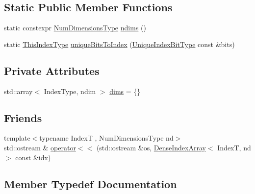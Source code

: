 \subsection*{Static Public Member Functions}
\begin{DoxyCompactItemize}
\item 
static constexpr \hyperlink{namespacevt_1_1index_a97aa9370711425850c86bcb7a20d73e8}{Num\+Dimensions\+Type} \hyperlink{structvt_1_1index_1_1_dense_index_array_a7a9a9e350279381589bfe1c75526c12a}{ndims} ()
\item 
static \hyperlink{structvt_1_1index_1_1_dense_index_array_a6915511f6a82dff2522d6e8c2be20f2a}{This\+Index\+Type} \hyperlink{structvt_1_1index_1_1_dense_index_array_ad9f18d4b0c0b5082c533286288c42529}{unique\+Bits\+To\+Index} (\hyperlink{namespacevt_a913e1f07b5228dd8bb64040dc6dcea14}{Unique\+Index\+Bit\+Type} const \&bits)
\end{DoxyCompactItemize}
\subsection*{Private Attributes}
\begin{DoxyCompactItemize}
\item 
std\+::array$<$ Index\+Type, ndim $>$ \hyperlink{structvt_1_1index_1_1_dense_index_array_a85e08cf36301f829ba9a15257c65f39c}{dims} = \{\}
\end{DoxyCompactItemize}
\subsection*{Friends}
\begin{DoxyCompactItemize}
\item 
{\footnotesize template$<$typename IndexT , Num\+Dimensions\+Type nd$>$ }\\std\+::ostream \& \hyperlink{structvt_1_1index_1_1_dense_index_array_ad8dd7b7925f5c66e3264bd14c3e4f2ce}{operator$<$$<$} (std\+::ostream \&os, \hyperlink{structvt_1_1index_1_1_dense_index_array}{Dense\+Index\+Array}$<$ IndexT, nd $>$ const \&idx)
\end{DoxyCompactItemize}


\subsection{Member Typedef Documentation}
\mbox{\label{structvt_1_1index_1_1_dense_index_array_ab44b9e5a65d28520268523fbe99f6a9d}} 
